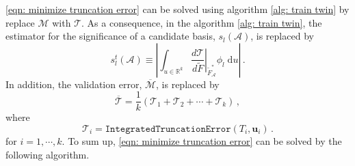 \eqref{eqn: minimize truncation error} can be solved using algorithm \ref{alg: train twin} by
replace $\mathcal{M}$ with $\mathcal{T}$. As a consequence, in the algorithm  \ref{alg: train twin}, 
the estimator for the 
significance of a candidate basis, $s_l(\mathcal{A})$, is replaced by 
\begin{equation}
    s_l^t(\mathcal{A}) \equiv \left|\int_{u\in \mathbb{R}^k} \left.\frac{d\mathcal{T}}{d \tilde{F}}
    \right|_{\tilde{F}_\mathcal{A}^*} \phi_l \; \textrm{d} u \right|\,.
    \label{eqn: basis significance 2}
\end{equation}
In addition, the validation error, $\overline{\mathcal{M}}$, is replaced by
\begin{equation}
    \overline{\mathcal{T}} = \frac{1}{k}\left( \mathcal{T}_1 + \mathcal{T}_2 + \cdots + 
    \mathcal{T}_k\right)\,,
    \label{eqn: pre train validation error}
\end{equation}
where
\begin{equation}
    \mathcal{T}_i = \texttt{IntegratedTruncationError}(T_i, \boldsymbol{u}_i)\,.
\end{equation}
for $i=1, \cdots, k$.
To sum up, \eqref{eqn: minimize truncation error} can be solved by the following algorithm.
